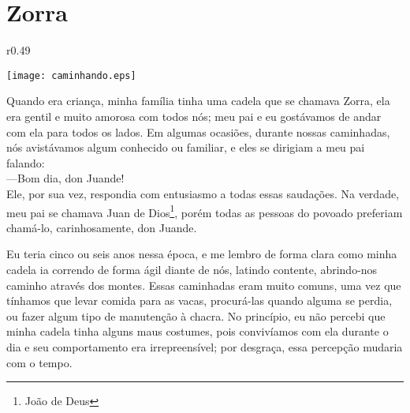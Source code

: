 \cleardoublepage
\newpage
\ifdefined\EnableIncludeImages
\fi
\chapter{Zorra}


\ifdefined\EnableIncludeImages
\begin{wrapfigure}{r}{0.49\textwidth}
  \begin{center}
  \vspace{-30pt}
    \texttt{[image: caminhando.eps]}
  \end{center}
  \vspace{-20pt}
\end{wrapfigure}
\fi
Quando era criança, minha família tinha uma cadela que se chamava Zorra, ela era gentil e muito amorosa com todos nós; meu pai e eu gostávamos de andar com ela para todos os lados. Em algumas ocasiões, durante nossas caminhadas, nós avistávamos algum conhecido ou familiar, e eles se dirigiam a meu pai falando:\\\indent 
---Bom dia, don Juande!\\\indent
Ele, por sua vez, respondia com entusiasmo a todas essas saudações. 
Na verdade, meu pai se chamava Juan de Dios\footnote{João de Deus}, porém todas as pessoas do povoado preferiam chamá-lo, carinhosamente, don Juande.

Eu teria cinco ou seis anos nessa época, e me lembro de forma clara como minha cadela ia correndo de forma ágil diante de nós, latindo contente, abrindo-nos caminho através dos montes.
Essas caminhadas eram muito comuns, uma vez que tínhamos que levar comida para as vacas, procurá-las quando alguma se perdia, ou fazer algum tipo de manutenção à chacra.
No princípio, eu não percebi que minha cadela tinha alguns maus costumes, 
pois convivíamos com ela durante o dia e seu comportamento era irrepreensível; 
por desgraça, essa percepção mudaria com o tempo. 

